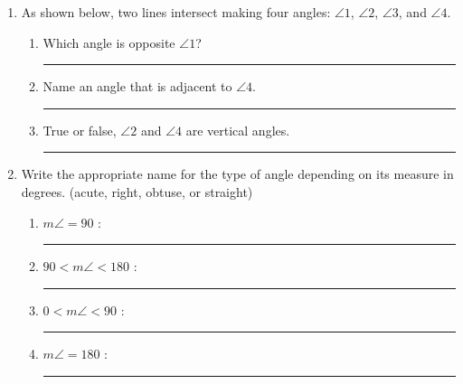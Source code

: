 \documentclass[12pt, twoside]{article}
\begin{document}
\begin{enumerate}
\item As shown below, two lines intersect making four angles: $\angle 1$, $\angle 2$, $\angle 3$, and $\angle 4$.
  \begin{center}
  \end{center}
  \begin{enumerate}
  \item Which angle is opposite $\angle 1$? \rule{4cm}{0.15mm} \bigskip
  \item Name an angle that is adjacent to $\angle 4$. \rule{4cm}{0.15mm} \bigskip
  \item True or false, $\angle 2$ and $\angle 4$ are vertical angles. \rule{3cm}{0.15mm}
\end{enumerate}

\newpage
\item Write the appropriate name for the type of angle depending on its measure in degrees. (acute, right, obtuse, or straight)
    \begin{enumerate}
      \item $m\angle = 90$ : \rule{4cm}{0.15mm} \bigskip
      \item $90 < m\angle < 180$ : \rule{4cm}{0.15mm} \bigskip
      \item $0< m\angle < 90$ : \rule{4cm}{0.15mm} \bigskip
      \item $m\angle = 180$ : \rule{4cm}{0.15mm} \bigskip
    \end{enumerate}


\end{enumerate}
\end{document}
